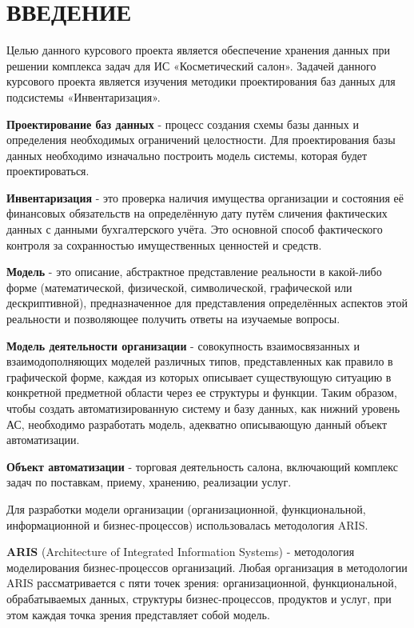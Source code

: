 {}
\section*{ВВЕДЕНИЕ}

Целью данного курсового проекта является обеспечение хранения данных при решении комплекса задач
для ИС «Косметический салон».
Задачей данного курсового проекта является изучения методики проектирования баз данных
для подсистемы «Инвентаризация».

\textbf{Проектирование баз данных} - процесс создания схемы базы данных
и определения необходимых ограничений целостности.
Для проектирования базы данных необходимо изначально построить модель системы,
которая будет проектироваться.

\textbf{Инвентаризация} - это проверка наличия имущества организации и состояния
её финансовых обязательств на определённую дату путём сличения фактических данных
с данными бухгалтерского учёта.
Это основной способ фактического контроля за сохранностью имущественных ценностей и средств.

\textbf{Модель} - это описание, абстрактное представление реальности в какой-либо форме
(математической, физической, символической, графической или дескриптивной),
предназначенное для представления определённых аспектов этой реальности
и позволяющее получить ответы на изучаемые вопросы.

\textbf{Модель деятельности организации} - совокупность взаимосвязанных и взаимодополняющих моделей различных типов,
представленных как правило в графической форме,
каждая из которых описывает существующую ситуацию в конкретной предметной области через ее структуры и функции.
Таким образом, чтобы создать автоматизированную систему и базу данных, как нижний уровень АС,
необходимо разработать модель, адекватно описывающую данный объект автоматизации.

\textbf{Объект автоматизации} - торговая деятельность салона, включающий комплекс задач по поставкам,
приему, хранению, реализации услуг.

Для разработки модели организации (организационной, функциональной, информационной и бизнес-процессов)
использовалась методология ARIS.

\textbf{ARIS} (Architecture of Integrated Information Systems) - методология моделирования бизнес-процессов организаций.
Любая организация в методологии ARIS рассматривается с пяти точек зрения:
организационной, функциональной, обрабатываемых данных, структуры бизнес-процессов,
продуктов и услуг, при этом каждая точка зрения представляет собой модель.

